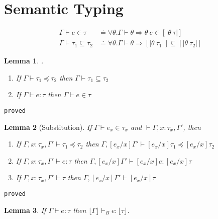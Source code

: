 \documentclass[10pt,a4paper]{article}
\newtheorem{lemma}{Lemma}
\newcommand\showproof[1]{\texttt{proved}}
\newcommand\sub[2]{\ensuremath{\left[ #2 / #1 \right]}}
\newcommand\erase[1]{\ensuremath{\lfloor #1 \rfloor}}
\newcommand\interp[1]{\ensuremath{[|#1|]}}
\newcommand\hastype[3]{\ensuremath{#1 \vdash #2 \colon #3}}
\newcommand\hastypebase[3]{\ensuremath{#1 \vdash_B #2 \colon #3}}
\newcommand\shastype[3]{\ensuremath{#1 \vdash #2 \in #3}}
\newcommand\iswellformed[2]{\ensuremath{#1 \vdash #2}}
\newcommand\issubtype[3]{\ensuremath{#1 \vdash #2 \preceq #3}}
\newcommand\sissubtype[3]{\ensuremath{#1 \vdash #2 \subseteq #3}}
\begin{document}
\section*{Semantic Typing}
\begin{align*}
\shastype{\Gamma}{e}{\tau} & \doteq
	\forall \theta . \iswellformed{\Gamma}{\theta} \Rightarrow \theta\ e \in \interp{\theta \ \tau}\\
\sissubtype{\Gamma}{\tau_1}{\tau_2} & \doteq 
	\forall \theta . \iswellformed{\Gamma}{\theta} \Rightarrow \interp{\theta\ \tau_1} \subseteq \interp{\theta\ \tau_2}
\end{align*}


\begin{lemma}.
\begin{enumerate}
\item If \issubtype{\Gamma}{\tau_1}{\tau_2} then \sissubtype{\Gamma}{\tau_1}{\tau_2} 
\item If \hastype{\Gamma}{e}{\tau} then \shastype{\Gamma}{e}{\tau} 
\end{enumerate}
\end{lemma}
\showproof{
	\begin{proof}
	
	\end{proof}
}


\begin{lemma}[Substitution]\label{lemma:substitution}
If \shastype{\Gamma}{e_x}{\tau_x} and \iswellformed{}{\Gamma, x\colon\tau_x ,\Gamma'}, then 
\begin{enumerate}
\item If 
	\issubtype{\Gamma, x\colon\tau_x, \Gamma'}{\tau_1}{\tau_2}
	then
	\issubtype{\Gamma, \sub{x}{e_x}\Gamma'}{\sub{x}{e_x}\tau_1}{\sub{x}{e_x}\tau_2}
\item If 
	\hastype{\Gamma, x\colon\tau_x, \Gamma'}{e}{\tau}
	then
	\hastype{\Gamma, \sub{x}{e_x}\Gamma'}{\sub{x}{e_x}e}{\sub{x}{e_x}\tau}
\item If 
	\iswellformed{\Gamma, x\colon\tau_x, \Gamma'}{\tau}
	then
	\iswellformed{\Gamma, \sub{x}{e_x}\Gamma'}{\sub{x}{e_x}\tau}
\end{enumerate}
\end{lemma}
\showproof{
	\begin{proof}
	
	\end{proof}
}

\begin{lemma}\label{lemma:erase} %
If \hastype{\Gamma}{e}{\tau} 
then \hastypebase{\erase{\Gamma}}{e}{\erase{\tau}}.
\end{lemma}
\end{document}
